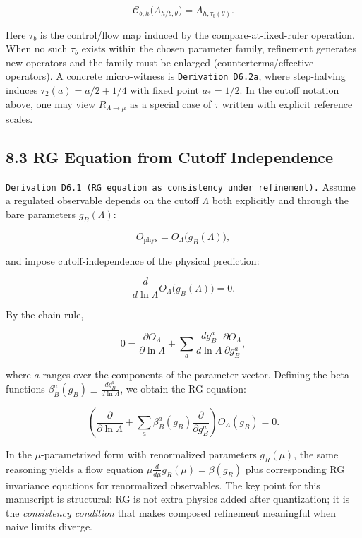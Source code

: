 \documentclass[
]{article}
\begin{document}
\[
\mathcal C_{b,h}\!\big(A_{h/b,\theta}\big)=A_{h,\tau_b(\theta)}.
\]

Here \(\tau_b\) is the control/flow map induced by the
compare-at-fixed-ruler operation. When no such \(\tau_b\) exists within
the chosen parameter family, refinement generates new operators and the
family must be enlarged (counterterms/effective operators). A concrete
micro-witness is \texttt{Derivation\ D6.2a}, where step-halving induces
\(\tau_2(a)=a/2+1/4\) with fixed point \(a_\ast=1/2\). In the cutoff
notation above, one may view \(R_{\Lambda\to\mu}\) as a special case of
\(\tau\) written with explicit reference scales.

\hypertarget{rg-equation-from-cutoff-independence}{%
\subsection{8.3 RG Equation from Cutoff
Independence}\label{rg-equation-from-cutoff-independence}}

\texttt{Derivation\ D6.1\ (RG\ equation\ as\ consistency\ under\ refinement).}
Assume a regulated observable depends on the cutoff \(\Lambda\) both
explicitly and through the bare parameters \(g_B(\Lambda)\):

\[
O_{\mathrm{phys}} = O_\Lambda\big(g_B(\Lambda)\big),
\]

and impose cutoff-independence of the physical prediction:

\[
\frac{d}{d\ln\Lambda} O_\Lambda\big(g_B(\Lambda)\big)=0.
\]

By the chain rule,

\[
0
=
\frac{\partial O_\Lambda}{\partial \ln\Lambda}
+
\sum_a \frac{d g_B^a}{d\ln\Lambda}\frac{\partial O_\Lambda}{\partial g_B^a}
,
\]

where \(a\) ranges over the components of the parameter vector. Defining
the beta functions \(\beta_B^a(g_B)\equiv \frac{d g_B^a}{d\ln\Lambda}\),
we obtain the RG equation:

\[
\left(\frac{\partial}{\partial \ln\Lambda}
+\sum_a \beta_B^a(g_B)\frac{\partial}{\partial g_B^a}\right)O_\Lambda(g_B)=0.
\]

In the \(\mu\)-parametrized form with renormalized parameters
\(g_R(\mu)\), the same reasoning yields a flow equation
\(\mu \frac{d}{d\mu}g_R(\mu)=\beta(g_R)\) plus corresponding RG
invariance equations for renormalized observables. The key point for
this manuscript is structural: RG is not extra physics added after
quantization; it is the \emph{consistency condition} that makes composed
refinement meaningful when naive limits diverge.
\end{document}
